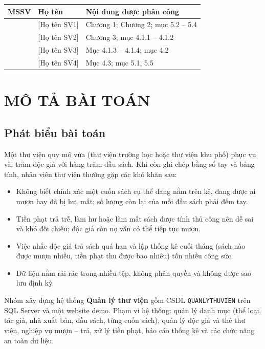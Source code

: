 \documentclass[13pt,a4paper,oneside]{extreport}
\begin{document}
\begin{center}\begin{tabular}{|p{2.6cm}|p{4.6cm}|p{6cm}|}\hline
\rowcolor{nenbang}\centering\textbf{MSSV} & \centering\textbf{Họ tên} & \centering\arraybackslash\textbf{Nội dung được phân công}\\\hline
[MSSV 1] & [Họ tên SV1] & Chương 1; Chương 2; mục 5.2 -- 5.4\\\hline
[MSSV 2] & [Họ tên SV2] & Chương 3; mục 4.1.1 -- 4.1.2\\\hline
[MSSV 3] & [Họ tên SV3] & Mục 4.1.3 -- 4.1.4; mục 4.2\\\hline
[MSSV 4] & [Họ tên SV4] & Mục 4.3; mục 5.1, 5.5\\\hline
\end{tabular}\end{center}

\clearpage
\tableofcontents
\clearpage
\listoftables
\vspace{1cm}
\listoffigures
\clearpage

\setcounter{page}{1}

\chapter{MÔ TẢ BÀI TOÁN}
\section{Phát biểu bài toán}
Một thư viện quy mô vừa (thư viện trường học hoặc thư viện khu phố) phục vụ vài trăm độc giả với hàng trăm đầu sách. Khi còn ghi chép bằng sổ tay và bảng tính, nhân viên thư viện thường gặp các khó khăn sau:
\begin{itemize}
\item Không biết chính xác một cuốn sách cụ thể đang nằm trên kệ, đang được ai mượn hay đã bị hư, mất; số lượng còn lại của mỗi đầu sách phải đếm tay.
\item Tiền phạt trả trễ, làm hư hoặc làm mất sách được tính thủ công nên dễ sai và khó đối chiếu; độc giả còn nợ vẫn có thể tiếp tục mượn.
\item Việc nhắc độc giả trả sách quá hạn và lập thống kê cuối tháng (sách nào được mượn nhiều, tiền phạt thu được bao nhiêu) tốn nhiều công sức.
\item Dữ liệu nằm rải rác trong nhiều tệp, không phân quyền và không được sao lưu định kỳ.
\end{itemize}
Nhóm xây dựng hệ thống \textbf{Quản lý thư viện} gồm CSDL \texttt{QUANLYTHUVIEN} trên SQL Server và một website demo. Phạm vi hệ thống: quản lý danh mục (thể loại, tác giả, nhà xuất bản, đầu sách, từng cuốn sách), quản lý độc giả và thẻ thư viện, nghiệp vụ mượn -- trả, xử lý tiền phạt, báo cáo thống kê và các chức năng an toàn dữ liệu.
\end{document}

